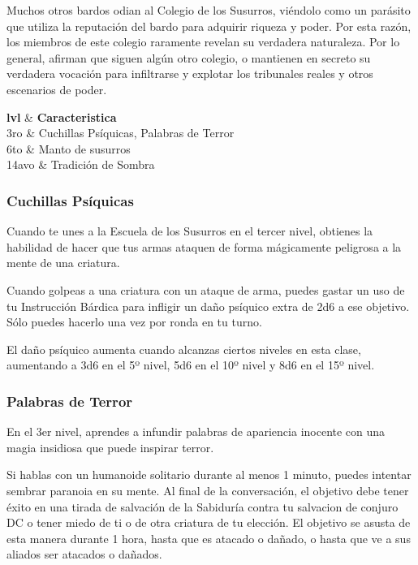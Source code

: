 \documentclass[a4paper,twocolumn,openany,10pt]{dndbook}
\begin{document}
Muchos otros bardos odian al Colegio de los Susurros, viéndolo como un parásito que utiliza la reputación del bardo para adquirir riqueza y
poder. Por esta razón, los miembros de este colegio raramente revelan su verdadera naturaleza. Por lo general, afirman que siguen algún otro
colegio, o mantienen en secreto su verdadera vocación para infiltrarse y explotar los tribunales reales y otros escenarios de poder.   

\begin{dndtable}[cX]
  \textbf{lvl} & \textbf{Caracteristica} 					\\
  	3ro		&	Cuchillas Psíquicas, Palabras de Terror	\\
	6to		&	Manto de susurros							\\
	14avo 	&	Tradición de Sombra							\\
\end{dndtable}

\subsubsection{Cuchillas Psíquicas}
Cuando te unes a la Escuela de los Susurros en el tercer nivel, obtienes la habilidad de hacer que tus armas ataquen de forma mágicamente
peligrosa a la mente de una criatura.

Cuando golpeas a una criatura con un ataque de arma, puedes gastar un uso de tu Instrucción Bárdica para infligir un daño psíquico extra de
2d6 a ese objetivo. Sólo puedes hacerlo una vez por ronda en tu turno.

El daño psíquico aumenta cuando alcanzas ciertos niveles en esta clase, aumentando a 3d6 en el 5º nivel, 5d6 en el 10º nivel y 8d6 en el 15º
nivel.  

\subsubsection{Palabras de Terror}
En el 3er nivel, aprendes a infundir palabras de apariencia inocente con una magia insidiosa que puede inspirar terror.

Si hablas con un humanoide solitario durante al menos 1 minuto, puedes intentar sembrar paranoia en su mente. Al final de la conversación,
el objetivo debe tener éxito en una tirada de salvación de la Sabiduría contra tu salvacion de conjuro DC o tener miedo de ti o de otra criatura de
tu elección. El objetivo se asusta de esta manera durante 1 hora, hasta que es atacado o dañado, o hasta que ve a sus aliados ser atacados o
dañados.
\end{document}
